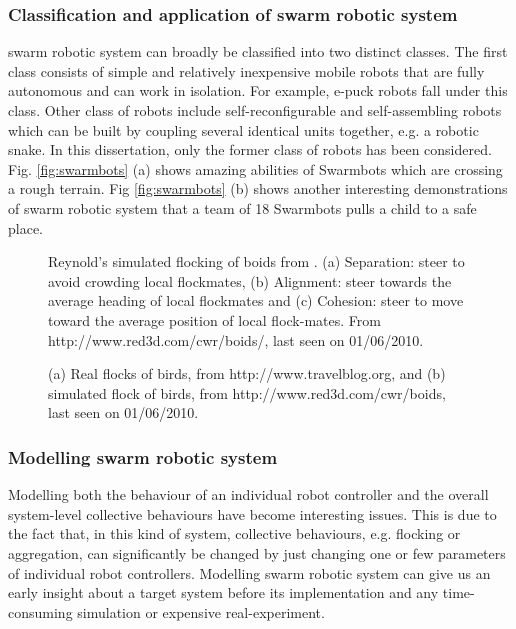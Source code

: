 \subsubsection*{Classification and application of swarm robotic system}
swarm robotic system can broadly be classified into two distinct classes. The first class consists of simple and relatively inexpensive mobile robots that are fully autonomous and can work in isolation. For example, e-puck robots \cite{Cianci+2004} fall under this class. Other class of robots include self-reconfigurable \cite{Fukuda+1987} and self-assembling robots which can be built by coupling several identical units together, e.g. a robotic snake. In this dissertation, only the former class of robots has been considered. Fig. \ref{fig:swarmbots} (a) shows amazing abilities of Swarmbots which are crossing a rough terrain. Fig \ref{fig:swarmbots} (b) shows another interesting demonstrations of swarm robotic system that a team of 18 Swarmbots pulls a child to a safe place.
\begin{figure}
\centering
{} 
\hspace{0.25cm}
\hspace{0.25cm}
\caption{ Reynold's simulated flocking of boids from \protect{}. (a) Separation: steer to avoid crowding local flockmates, (b) Alignment: steer towards the average heading of local flockmates and (c) Cohesion: steer to move toward the average position of local flock-mates. \protect\newline  From http://www.red3d.com/cwr/boids/, last seen on 01/06/2010.}
\label{fig:boid-rules}
\end{figure}
\begin{figure}
\centering
{} 
\hspace{0.25cm}
\caption{ (a) Real flocks of birds, from http://www.travelblog.org, and (b) simulated flock of birds, from http://www.red3d.com/cwr/boids, last seen on 01/06/2010.}
\label{fig:flocking-birds}
\end{figure}
\subsubsection*{Modelling swarm robotic system}
Modelling both the behaviour of an individual robot controller and the overall system-level collective behaviours have become interesting issues. This is due to the fact that, in this kind of system, collective behaviours, e.g. flocking or aggregation, can significantly be changed by just changing one or few parameters of individual robot controllers. Modelling swarm robotic system can give us an early insight about a target system before its implementation and any time-consuming simulation or expensive real-experiment.

